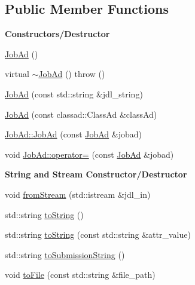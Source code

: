 \subsection*{Public Member Functions}
\begin{Indent}{\bf Constructors/Destructor}\par
\begin{CompactItemize}
\item 
\hyperlink{classglite_1_1wms_1_1jdl_1_1JobAd_z1_0}{Job\-Ad} ()
\item 
virtual \hyperlink{classglite_1_1wms_1_1jdl_1_1JobAd_z1_1}{$\sim$Job\-Ad} ()  throw ()
\item 
\hyperlink{classglite_1_1wms_1_1jdl_1_1JobAd_z1_2}{Job\-Ad} (const std::string \&jdl\_\-string)
\item 
\hyperlink{classglite_1_1wms_1_1jdl_1_1JobAd_z1_3}{Job\-Ad} (const classad::Class\-Ad \&class\-Ad)
\item 
\hyperlink{classglite_1_1wms_1_1jdl_1_1JobAd_z1_4}{Job\-Ad::Job\-Ad} (const \hyperlink{classglite_1_1wms_1_1jdl_1_1JobAd}{Job\-Ad} \&jobad)
\item 
void \hyperlink{classglite_1_1wms_1_1jdl_1_1JobAd_z1_5}{Job\-Ad::operator=} (const \hyperlink{classglite_1_1wms_1_1jdl_1_1JobAd}{Job\-Ad} \&jobad)
\end{CompactItemize}
\end{Indent}
\begin{Indent}{\bf String and Stream Constructor/Destructor}\par
\begin{CompactItemize}
\item 
void \hyperlink{classglite_1_1wms_1_1jdl_1_1JobAd_z3_0}{from\-Stream} (std::istream \&jdl\_\-in)
\item 
std::string \hyperlink{classglite_1_1wms_1_1jdl_1_1JobAd_z3_1}{to\-String} ()
\item 
std::string \hyperlink{classglite_1_1wms_1_1jdl_1_1JobAd_z3_2}{to\-String} (const std::string \&attr\_\-value)
\item 
std::string \hyperlink{classglite_1_1wms_1_1jdl_1_1JobAd_z3_3}{to\-Submission\-String} ()
\item 
void \hyperlink{classglite_1_1wms_1_1jdl_1_1JobAd_z3_4}{to\-File} (const std::string \&file\_\-path)
\end{CompactItemize}
\end{Indent}
